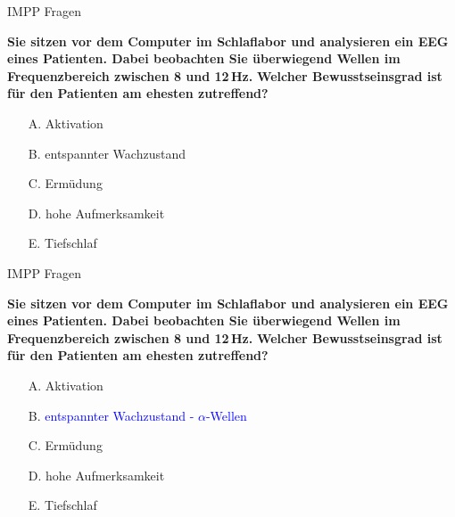 \documentclass{beamer}
\begin{document}

\begin{frame}{IMPP Fragen}

\textbf{Sie sitzen vor dem Computer im Schlaflabor und analysieren ein EEG eines Patienten. Dabei beobachten Sie überwiegend Wellen im Frequenzbereich zwischen 8 und 12\,Hz. }
\textbf{Welcher Bewusstseinsgrad ist für den Patienten am ehesten zutreffend?} \\[0.2 cm]

\begin{itemize}
\item[A.] Aktivation
\item[B.] entspannter Wachzustand
\item[C.] Ermüdung
\item[D.] hohe Aufmerksamkeit
\item[E.] Tiefschlaf
\end{itemize}

\end{frame}


\begin{frame}{IMPP Fragen}

\textbf{Sie sitzen vor dem Computer im Schlaflabor und analysieren ein EEG eines Patienten. Dabei beobachten Sie überwiegend Wellen im Frequenzbereich zwischen 8 und 12\,Hz. }
\textbf{Welcher Bewusstseinsgrad ist für den Patienten am ehesten zutreffend?} \\[0.2 cm]

\begin{itemize}
\item[A.] Aktivation
\item[B.] \textcolor{blue}{entspannter Wachzustand  - \(\alpha\)-Wellen}  
\item[C.] Ermüdung
\item[D.] hohe Aufmerksamkeit
\item[E.] Tiefschlaf
\end{itemize}

\end{frame}






\end{document}
